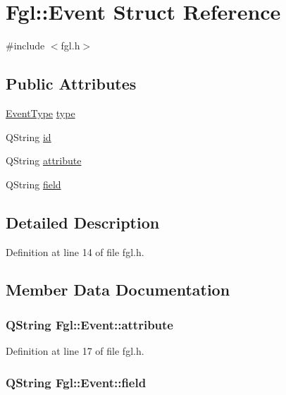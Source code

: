 \hypertarget{structFgl_1_1Event}{
\section{Fgl::Event Struct Reference}
\label{structFgl_1_1Event}
}


{\ttfamily \#include $<$fgl.h$>$}

\subsection*{Public Attributes}
\begin{DoxyCompactItemize}
\item 
\hyperlink{namespaceFgl_a7bbae69263a5d0012370d5cbb859c6a8}{EventType} \hyperlink{structFgl_1_1Event_afa40f4cb59b82a49e431a4233e77aa37}{type}
\item 
QString \hyperlink{structFgl_1_1Event_a28367efebda5c671dc1e82084e18f0eb}{id}
\item 
QString \hyperlink{structFgl_1_1Event_af77c15903b8674b655c055f686bc0159}{attribute}
\item 
QString \hyperlink{structFgl_1_1Event_a3dc3e7b462f744c1794efffeadc577a8}{field}
\end{DoxyCompactItemize}


\subsection{Detailed Description}


Definition at line 14 of file fgl.h.



\subsection{Member Data Documentation}
\hypertarget{structFgl_1_1Event_af77c15903b8674b655c055f686bc0159}{
\subsubsection[{attribute}]{\setlength{\rightskip}{0pt plus 5cm}QString {\bf Fgl::Event::attribute}}}
\label{structFgl_1_1Event_af77c15903b8674b655c055f686bc0159}


Definition at line 17 of file fgl.h.

\hypertarget{structFgl_1_1Event_a3dc3e7b462f744c1794efffeadc577a8}{
\subsubsection[{field}]{\setlength{\rightskip}{0pt plus 5cm}QString {\bf Fgl::Event::field}}}
\label{structFgl_1_1Event_a3dc3e7b462f744c1794efffeadc577a8}


